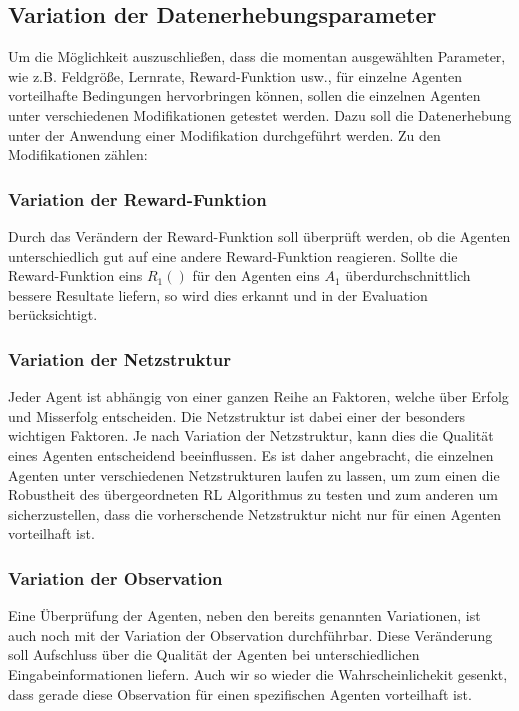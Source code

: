 \subsection{Variation der Datenerhebungsparameter}
Um die Möglichkeit auszuschließen, dass die momentan ausgewählten Parameter, wie z.B. Feldgröße, Lernrate, Reward-Funktion usw., für einzelne Agenten vorteilhafte Bedingungen hervorbringen können, sollen die einzelnen Agenten unter verschiedenen Modifikationen getestet werden. Dazu soll die Datenerhebung unter der Anwendung einer Modifikation durchgeführt werden. Zu den Modifikationen zählen:

\subsubsection{Variation der Reward-Funktion}
Durch das Verändern der Reward-Funktion soll überprüft werden, ob die Agenten unterschiedlich gut auf eine andere Reward-Funktion reagieren. Sollte die Reward-Funktion eins $R_{1}()$ für den Agenten eins $A_{1}$ überdurchschnittlich bessere Resultate liefern, so wird dies erkannt und in der Evaluation berücksichtigt.

\subsubsection{Variation der Netzstruktur}
Jeder Agent ist abhängig von einer ganzen Reihe an Faktoren, welche über Erfolg und Misserfolg entscheiden. Die Netzstruktur ist dabei einer der besonders wichtigen Faktoren. Je nach Variation der Netzstruktur, kann dies die Qualität eines Agenten entscheidend beeinflussen. Es ist daher angebracht, die einzelnen Agenten unter verschiedenen Netzstrukturen laufen zu lassen, um zum einen die Robustheit des übergeordneten RL Algorithmus zu testen und zum anderen um sicherzustellen, dass die vorherschende Netzstruktur nicht nur für einen Agenten vorteilhaft ist.

\subsubsection{Variation der Observation}
Eine Überprüfung der Agenten, neben den bereits genannten Variationen, ist auch noch mit der Variation der Observation durchführbar. Diese Veränderung soll Aufschluss über die Qualität der Agenten bei unterschiedlichen Eingabeinformationen liefern. Auch wir so wieder die Wahrscheinlichekit gesenkt, dass gerade diese Observation für einen spezifischen Agenten vorteilhaft ist.

